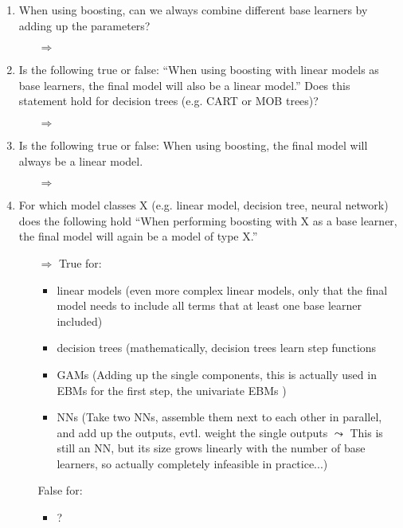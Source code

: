 \begin{enumerate}
        \item When using boosting, can we always combine different base learners by adding up the parameters?
        \begin{itemize}
            \item[$\Rightarrow$] 
        \end{itemize}

        \item Is the following true or false: ``When using boosting with linear models as base learners, the final model will also be a linear model.''
        Does this statement hold for decision trees (e.g. CART or MOB trees)?
        \begin{itemize}
            \item[$\Rightarrow$] 
        \end{itemize}

        \item Is the following true or false: When using boosting, the final model will always be a linear model.
        \begin{itemize}
            \item[$\Rightarrow$] 
        \end{itemize}

        \item For which model classes X (e.g. linear model, decision tree, neural network) does the following hold ``When performing boosting with X as a base learner, the final model will again be a model of type X.''
        \begin{itemize}
            \item[$\Rightarrow$] True for:
            \begin{itemize}
                \item linear models (even more complex linear models, only that the final model needs to include all terms that at least one base learner included)
                \item decision trees (mathematically, decision trees learn step functions
                \item GAMs (Adding up the single components, this is actually used in EBMs for the first step, the univariate EBMs  )
                \item NNs (Take two NNs, assemble them next to each other in parallel, and add up the outputs, evtl. weight the single outputs $\leadsto$ This is still an NN, but its size grows linearly with the number of base learners, so actually completely infeasible in practice...)
            \end{itemize}
            False for:
            \begin{itemize}
                \item ?
            \end{itemize}
        \end{itemize}


\end{enumerate}
